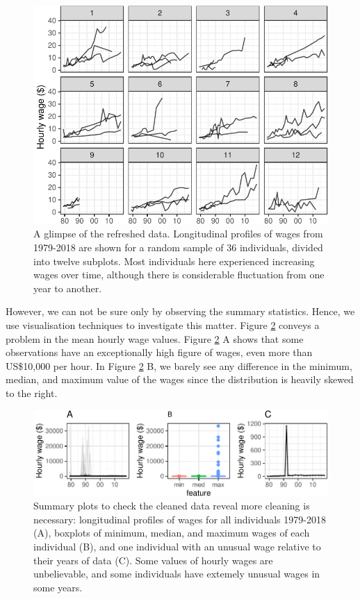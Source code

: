 \documentclass{article}
\begin{document}
\begin{figure}

{\centering \includegraphics[width=1\linewidth]{figures/sample-plot-1} 

}

\caption{A glimpse of the refreshed data. Longitudinal profiles of wages from 1979-2018 are shown for a random sample of 36 individuals, divided into twelve subplots. Most individuals here experienced increasing wages over time, although there is considerable fluctuation from one year to another.}\label{fig:sample-plot}
\end{figure}

However, we can not be sure only by observing the summary statistics. Hence, we use visualisation techniques to investigate this matter. Figure \ref{fig:feature-plot} conveys a problem in the mean hourly wage values. Figure \ref{fig:feature-plot} A shows that some observations have an exceptionally high figure of wages, even more than US\$10,000 per hour. In Figure \ref{fig:feature-plot} B, we barely see any difference in the minimum, median, and maximum value of the wages since the distribution is heavily skewed to the right.

\begin{figure}

{\centering \includegraphics[width=432px]{figures/feature-plot-1} 

}

\caption{Summary plots to check the cleaned data reveal more cleaning is necessary: longitudinal profiles of wages for all individuals 1979-2018 (A), boxplots of minimum, median, and maximum wages of each individual (B), and one individual with an unusual wage relative to their years of data (C). Some values of hourly wages are unbelievable, and some individuals have extemely unusual wages in some years.}\label{fig:feature-plot}
\end{figure}
\end{document}
